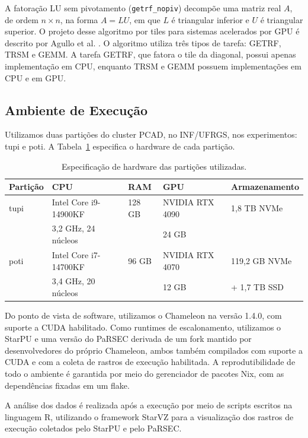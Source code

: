 \documentclass[12pt]{article}
\begin{document}
A fatoração LU sem pivotamento (\texttt{getrf\_nopiv}) decompõe uma matriz real $A$, de ordem $n \times n$, na forma $A = LU$, em que $L$ é triangular inferior e $U$ é triangular superior. O projeto desse algoritmo por tiles para sistemas acelerados por GPU é descrito por Agullo et al. \cite{6126599}. O algoritmo utiliza três tipos de tarefa: GETRF, TRSM e GEMM. A tarefa GETRF, que fatora o tile da diagonal, possui apenas implementação em CPU, enquanto TRSM e GEMM possuem implementações em CPU e em GPU.

\subsection{Ambiente de Execução}

Utilizamos duas partições do cluster PCAD, no INF/UFRGS, nos experimentos: tupi e poti. A Tabela~\ref{tab:hw} especifica o hardware de cada partição.

\begin{table}[h]
	\centering
	\caption{Especificação de hardware das partições utilizadas.}
	\label{tab:hw}
	\begin{tabular}{@{}lllll@{}}
		\toprule
		Partição & CPU                   & RAM    & GPU             & Armazenamento \\
		\midrule
		tupi     & Intel Core i9-14900KF & 128 GB & NVIDIA RTX 4090 & 1,8 TB NVMe   \\
		         & 3,2 GHz, 24 núcleos   &        & 24 GB           &               \\
		poti     & Intel Core i7-14700KF & 96 GB  & NVIDIA RTX 4070 & 119,2 GB NVMe \\
		         & 3,4 GHz, 20 núcleos   &        & 12 GB           & + 1,7 TB SSD  \\
		\bottomrule
	\end{tabular}
\end{table}

Do ponto de vista de software, utilizamos o Chameleon na versão 1.4.0, com suporte a CUDA habilitado. Como runtimes de escalonamento, utilizamos o StarPU e uma versão do PaRSEC derivada de um fork mantido por desenvolvedores do próprio Chameleon, ambos também compilados com suporte a CUDA e com a coleta de rastros de execução habilitada. A reprodutibilidade de todo o ambiente é garantida por meio do gerenciador de pacotes Nix, com as dependências fixadas em um flake.

A análise dos dados é realizada após a execução por meio de scripts escritos na linguagem R, utilizando o framework StarVZ \cite{Pinto2021ProvidingIP} para a visualização dos rastros de execução coletados pelo StarPU e pelo PaRSEC.
\end{document}
